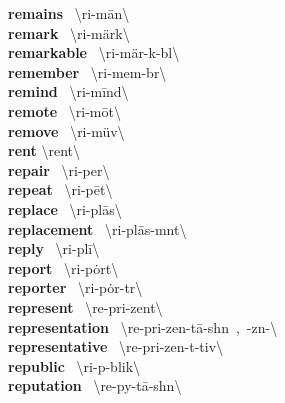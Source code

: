 \documentclass[10pt,a4paper]{article}
\begin{document}
\begin{multicols}{2}
\textbf{ remains }\quad \ \textbackslash ri-\textprimstress m\={a}n\textbackslash \\
\textbf{ remark }\quad \ \textbackslash ri-\textprimstress m\"{a}rk\textbackslash \\
\textbf{ remarkable }\quad \ \textbackslash ri-\textprimstress m\"{a}r-k\textschwa -b\textschwa l\textbackslash \\
\textbf{ remember }\quad \ \textbackslash ri-\textprimstress mem-b\textschwa r\textbackslash \\
\textbf{ remind }\quad \ \textbackslash ri-\textprimstress m\={i}nd\textbackslash \\
\textbf{ remote }\quad \ \textbackslash ri-\textprimstress m\={o}t\textbackslash \\
\textbf{ remove }\quad \ \textbackslash ri-\textprimstress m\"{u}v\textbackslash \\
\textbf{ rent }\quad \textbackslash \textprimstress rent\textbackslash \\
\textbf{ repair }\quad \ \textbackslash ri-\textprimstress per\textbackslash \\
\textbf{ repeat }\quad \ \textbackslash ri-\textprimstress p\={e}t\textbackslash \\
\textbf{ replace }\quad \ \textbackslash ri-\textprimstress pl\={a}s\textbackslash \\
\textbf{ replacement }\quad \ \textbackslash ri-\textprimstress pl\={a}s-m\textschwa nt\textbackslash \\
\textbf{ reply }\quad \ \textbackslash ri-\textprimstress pl\={i}\textbackslash \\
\textbf{ report }\quad \ \textbackslash ri-\textprimstress p\.{o}rt\textbackslash \\
\textbf{ reporter }\quad \ \textbackslash ri-\textprimstress p\.{o}r-t\textschwa r\textbackslash \\
\textbf{ represent }\quad \ \textbackslash \textsecstress re-pri-\textprimstress zent\textbackslash \\
\textbf{ representation }\quad \ \textbackslash \textsecstress re-pri-\textsecstress zen-\textprimstress t\={a}-sh\textschwa n\ ,\ -z\textschwa n-\textbackslash \\
\textbf{ representative }\quad \ \textbackslash \textsecstress re-pri-\textprimstress zen-t\textschwa -tiv\textbackslash \\
\textbf{ republic }\quad \ \textbackslash ri-\textprimstress p\textschwa -blik\textbackslash \\
\textbf{ reputation }\quad \ \textbackslash \textsecstress re-py\textschwa -\textprimstress t\={a}-sh\textschwa n\textbackslash \\

\end{multicols}
\end{document}
